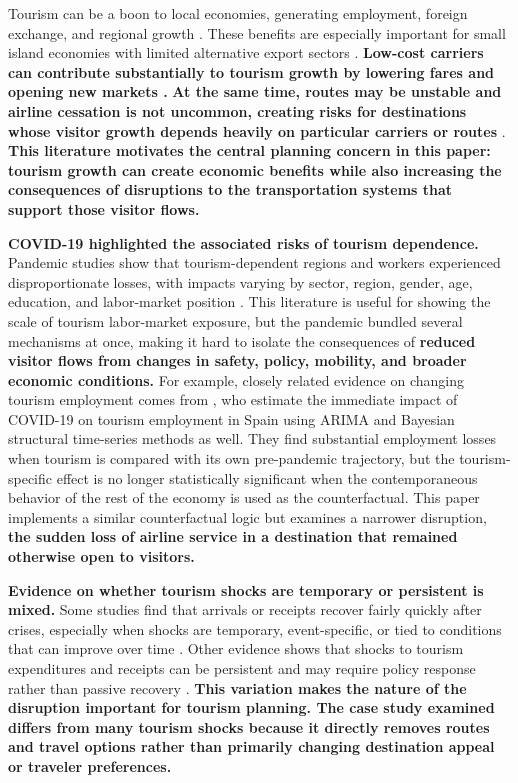 \documentclass[12pt]{article}
\begin{document}
Tourism can be a boon to local economies, generating employment, foreign exchange, and regional growth \citep{gwenhure_2017_tourism,seetanah_2011_assessing,faber_2019_tourism}. These benefits are especially important for small island economies with limited alternative export sectors \citep{seetanah_2011_assessing,roudi_2018_new,kumar_2021_tourism}. \textbf{Low-cost carriers can contribute substantially to tourism growth by lowering fares and opening new markets \citep{pulina_2010_have,chung_2011_korean,hongtsui_2017_does}.} \textbf{At the same time, routes may be unstable and airline cessation is not uncommon, creating risks for destinations whose visitor growth depends heavily on particular carriers or routes} \citep{bachwich_wittman_2017_ulcc,sun_zheng_wang_wandelt_2025_cessation}. \textbf{This literature motivates the central planning concern in this paper: tourism growth can create economic benefits while also increasing the consequences of disruptions to the transportation systems that support those visitor flows.}

\textbf{COVID-19 highlighted the associated risks of tourism dependence.} Pandemic studies show that tourism-dependent regions and workers experienced disproportionate losses, with impacts varying by sector, region, gender, age, education, and labor-market position \citep{duro_2021_covid19,sun_2021_vulnerable,sun_2022_job_vulnerability,zhang_yang_2025_macau}. This literature is useful for showing the scale of tourism labor-market exposure, but the pandemic bundled several mechanisms at once, making it hard to isolate the consequences of \textbf{reduced visitor flows from changes in safety, policy, mobility, and broader economic conditions.} For example, closely related evidence on changing tourism employment comes from \citet{perles_ribes_2021_immediate}, who estimate the immediate impact of COVID-19 on tourism employment in Spain using ARIMA and Bayesian structural time-series methods as well. They find substantial employment losses when tourism is compared with its own pre-pandemic trajectory, but the tourism-specific effect is no longer statistically significant when the contemporaneous behavior of the rest of the economy is used as the counterfactual. This paper implements a similar counterfactual logic but examines a narrower disruption, \textbf{the sudden loss of airline service in a destination that remained otherwise open to visitors.}

\textbf{Evidence on whether tourism shocks are temporary or persistent is mixed.} Some studies find that arrivals or receipts recover fairly quickly after crises, especially when shocks are temporary, event-specific, or tied to conditions that can improve over time \citep{saleh_2011_do,yucel_2020_are,morakabati_2019_a}. Other evidence shows that shocks to tourism expenditures and receipts can be persistent and may require policy response rather than passive recovery \citep{payne_nazlioglu_2023_permanent,kocak_2025_receipts}. \textbf{This variation makes the nature of the disruption important for tourism planning. The case study examined differs from many tourism shocks because it directly removes routes and travel options rather than primarily changing destination appeal or traveler preferences.}
\end{document}
